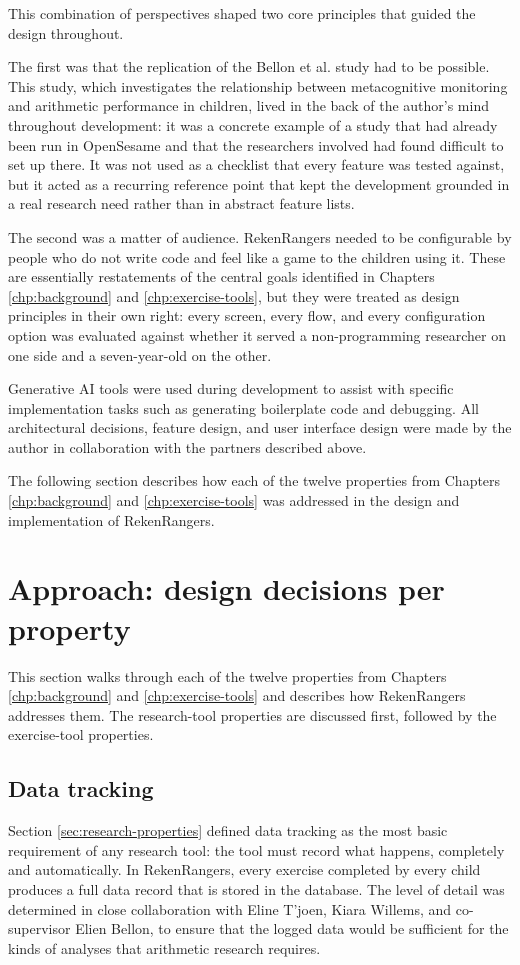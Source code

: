 This combination of perspectives shaped two core principles that guided the design throughout.

The first was that the replication of the Bellon et al. study \cite{bellon_more_2019} had to be possible. This study, which investigates the relationship between metacognitive monitoring and arithmetic performance in children, lived in the back of the author's mind throughout development: it was a concrete example of a study that had already been run in OpenSesame and that the researchers involved had found difficult to set up there. It was not used as a checklist that every feature was tested against, but it acted as a recurring reference point that kept the development grounded in a real research need rather than in abstract feature lists.

The second was a matter of audience. RekenRangers needed to be configurable by people who do not write code and feel like a game to the children using it. These are essentially restatements of the central goals identified in Chapters \ref{chp:background} and \ref{chp:exercise-tools}, but they were treated as design principles in their own right: every screen, every flow, and every configuration option was evaluated against whether it served a non-programming researcher on one side and a seven-year-old on the other.

Generative AI tools were used during development to assist with specific implementation tasks such as generating boilerplate code and debugging. All architectural decisions, feature design, and user interface design were made by the author in collaboration with the partners described above.

The following section describes how each of the twelve properties from Chapters \ref{chp:background} and \ref{chp:exercise-tools} was addressed in the design and implementation of RekenRangers.

\section{Approach: design decisions per property}
This section walks through each of the twelve properties from Chapters \ref{chp:background} and \ref{chp:exercise-tools} and describes how RekenRangers addresses them. The research-tool properties are discussed first, followed by the exercise-tool properties.

\subsection{Data tracking}
\label{sec:data-tracking}
Section \ref{sec:research-properties} defined data tracking as the most basic requirement of any research tool: the tool must record what happens, completely and automatically. In RekenRangers, every exercise completed by every child produces a full data record that is stored in the database. The level of detail was determined in close collaboration with Eline T'joen, Kiara Willems, and co-supervisor Elien Bellon, to ensure that the logged data would be sufficient for the kinds of analyses that arithmetic research requires.

